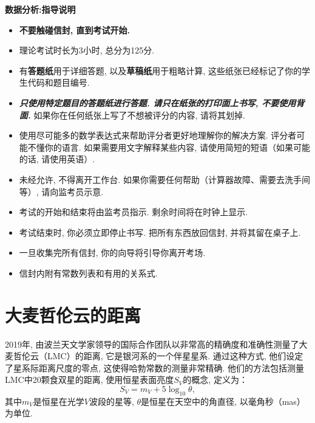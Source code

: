 \documentclass[a4paper,fontset=fandol]{ctexart}
\begin{document}
	{
	\Large\bfseries\noindent 数据分析:\hspace{0.5em}指导说明
	}
	
	\begin{itemize}
		\item \textbf{不要触碰信封, 直到考试开始. }
		
		\item 理论考试时长为3小时, 总分为125分.
		
		\item 有\textbf{答题纸}用于详细答题, 以及\textbf{草稿纸}用于粗略计算, 这些纸张已经标记了你的学生代码和题目编号.
		
		\item {\bfseries\itshape 只使用特定题目的答题纸进行答题. 请只在纸张的打印面上书写, 不要使用背面. }如果你在任何纸张上写了不想被评分的内容, 请将其划掉. 
		
		\item 使用尽可能多的数学表达式来帮助评分者更好地理解你的解决方案. 评分者可能不懂你的语言. 如果需要用文字解释某些内容, 请使用简短的短语（如果可能的话, 请使用英语）. 
		
		\item 未经允许, 不得离开工作台. 如果你需要任何帮助（计算器故障、需要去洗手间等）, 请向监考员示意.
		
		\item 考试的开始和结束将由监考员指示. 剩余时间将在时钟上显示. 
		
		\item 考试结束时, 你必须立即停止书写. 把所有东西放回信封, 并将其留在桌子上. 
		
		\item 一旦收集完所有信封, 你的向导将引导你离开考场. 
		
		\item 信封内附有常数列表和有用的关系式. 
	\end{itemize}
	
	\newpage
	\section{大麦哲伦云的距离}
	
	2019年, 由波兰天文学家领导的国际合作团队以非常高的精确度和准确性测量了大麦哲伦云（LMC）的距离, 它是银河系的一个伴星星系. 通过这种方式, 他们设定了星系际距离尺度的零点, 这使得哈勃常数的测量非常精确. 他们的方法包括测量LMC中20颗食双星的距离, 使用恒星表面亮度$S_V$的概念, 定义为：
	\[S_V=m_V+5\log_{10}\theta,\]
	其中$m_V$是恒星在光学$V$波段的星等, $\theta$是恒星在天空中的角直径, 以毫角秒（mas）为单位. 
	
\end{document}
